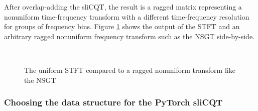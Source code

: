 \documentclass[report.tex]{subfiles}
\begin{document}
After overlap-adding the sliCQT, the result is a ragged matrix representing a nonuniform time-frequency transform with a different time-frequency resolution for groups of frequency bins. Figure \ref{fig:contraststftslicqt} shows the output of the STFT and an arbitrary ragged nonuniform frequency transform such as the NSGT side-by-side.

\begin{figure}[ht]
	\centering
	\\
	\caption{The uniform STFT compared to a ragged nonuniform transform like the NSGT}
	\label{fig:contraststftslicqt}
\end{figure}

\subsubsection{Choosing the data structure for the PyTorch sliCQT}
\label{sec:torchslicqdatastructure}
\end{document}
